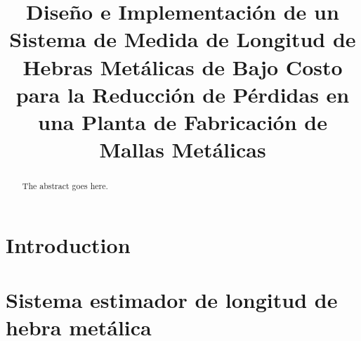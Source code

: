 \documentclass[conference]{IEEEtran}
\begin{document}
%
\title{
  Diseño e Implementación de un Sistema de Medida de Longitud de
  Hebras Metálicas de Bajo Costo para la Reducción de Pérdidas
  en una Planta de Fabricación de Mallas Metálicas
}


\author{
  \and
}



\maketitle

\begin{abstract}
The abstract goes here.
\end{abstract}


%
\IEEEpeerreviewmaketitle

\section{Introduction}


\section{Sistema estimador de longitud de hebra metálica}

\end{document}
